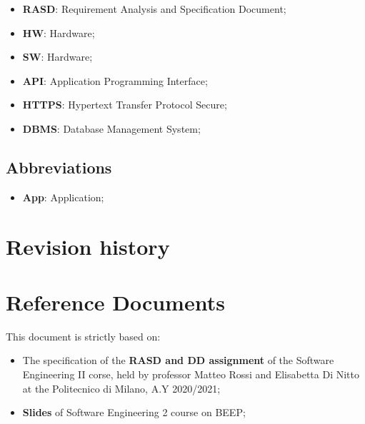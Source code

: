 \begin{itemize}
\subsection{Acronyms}
\item \textbf{RASD}: Requirement Analysis and Specification Document;
\item \textbf{HW}: Hardware;
\item \textbf{SW}: Hardware;
\item \textbf{API}: Application Programming Interface;
\item \textbf{HTTPS}: Hypertext Transfer Protocol Secure;
\item \textbf{DBMS}: Database Management System;

\end{itemize}




\subsection{Abbreviations}
\begin{itemize}
\item \textbf{App}: Application;

\end{itemize}



\section{Revision history}

\section{Reference Documents}
This document is strictly based on:
\begin{itemize}
\item The specification of the \textbf{RASD and DD assignment} of the Software Engineering II corse, held by professor Matteo Rossi and Elisabetta Di Nitto at the Politecnico di Milano, A.Y 2020/2021;
\item \textbf{Slides} of Software Engineering 2 course on BEEP;
\end{itemize}
